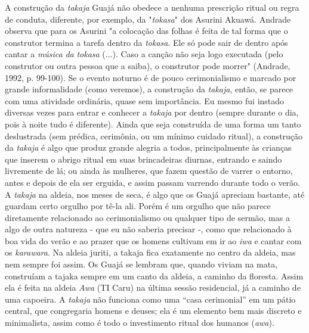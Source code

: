 A construção da \emph{takaja} Guajá não obedece a nenhuma prescrição
ritual ou regra de conduta, diferente, por exemplo, da "\emph{tokasa}"
dos Asurini Akuawá. Andrade observa que para os Asurini "a colocação das
folhas é feita de tal forma que o construtor termina a tarefa dentro da
\emph{tokasa}. Ele só pode sair de dentro após cantar a \emph{música}
\emph{da} \emph{tokasa} (...). Caso a canção não seja logo executada
(pelo construtor ou outra pessoa que a saiba), o construtor pode morrer"
(Andrade, 1992, p. 99-100). Se o evento noturno é de pouco
cerimonialismo e marcado por grande informalidade (como veremos), a
construção da \emph{takaja}, então, se parece com uma atividade
ordinária, quase sem importância. Eu mesmo fui instado diversas vezes
para entrar e conhecer a \emph{takaja} por dentro (sempre durante o dia,
pois à noite tudo é diferente). Ainda que seja construída de uma forma
um tanto deslustrada (sem prédica, cerimônia, ou um mínimo cuidado
ritual), a construção da \emph{takaja} é algo que produz grande alegria
a todos, principalmente às crianças que inserem o abrigo ritual em suas
brincadeiras diurnas, entrando e saindo livremente de lá; ou ainda às
mulheres, que fazem questão de varrer o entorno, antes e depois de ela
ser erguida, e assim passam varrendo durante todo o verão. A
\emph{takaja} na aldeia, nos meses de seca, é algo que os Guajá apreciam
bastante, até guardam certo orgulho por tê-la ali. Porém é um orgulho
que não parece diretamente relacionado ao cerimonialismo ou qualquer
tipo de sermão, mas a algo de outra natureza - que eu não saberia
precisar -, como que relacionado à boa vida do verão e ao prazer que os
homens cultivam em ir ao \emph{iwa} e cantar com os \emph{karawara}. Na
aldeia juriti, a takaja fica exatamente no centro da aldeia, mas nem
sempre foi assim. Os Guajá se lembram que, quando viviam na mata,
construíam a tajaka sempre em um canto da aldeia, a caminho da floresta.
Assim ela é feita na aldeia \emph{Awa} (TI Caru) na última sessão
residencial, já a caminho de uma capoeira. A \emph{takaja} não funciona
como uma ``casa cerimonial'' em um pátio central, que congregaria homens
e deuses; ela é um elemento bem mais discreto e minimalista, assim como
é todo o investimento ritual dos humanos (\emph{awa}).

